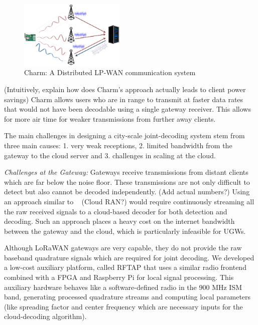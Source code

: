\begin{figure}
    \centering
    \includegraphics[width=0.45\textwidth]{figures/ChirpRAN.jpg}
    \caption{Charm: A Distributed LP-WAN communication system}
    \label{fig:my_label}
\end{figure}

{\color{blue} (Intuitively, explain how does Charm's approach actually leads to client power savings)}
Charm allows users who are in range to transmit at faster data rates that would not have been decodable using a single gateway receiver. 
This allows for more air time for weaker transmissions from further away clients. 

The main challenges in designing a city-scale joint-decoding system stem from three main causes: 1. very weak receptions, 2. limited bandwidth from the gateway to the cloud server and 3. challenges in scaling at the cloud.

\textit{Challenges at the Gateway:} Gateways receive transmissions from distant clients which are far below the noise floor. These transmissions are not only difficult to detect but also cannot be decoded independently. {\color{blue} (Add actual numbers?)}
Using an approach similar to {\color{red}~\cite{} (Cloud RAN?)} would require continuously streaming all the raw received signals to a cloud-based decoder for both detection and decoding.
Such an approach places a heavy cost on the internet bandwidth between the gateway and the cloud, which is particularly infeasible for UGWs.

Although LoRaWAN gateways are very capable, they do not provide the raw baseband quadrature signals which are required for joint decoding. 
We developed a low-cost auxiliary platform, called RFTAP that uses a similar radio frontend combined with a FPGA and Raspberry Pi for local signal processing. 
This auxiliary hardware behaves like a software-defined radio in the 900 MHz ISM band, generating processed quadrature streams and computing local parameters (like spreading factor and center frequency which are necessary inputs for the cloud-decoding algorithm).

